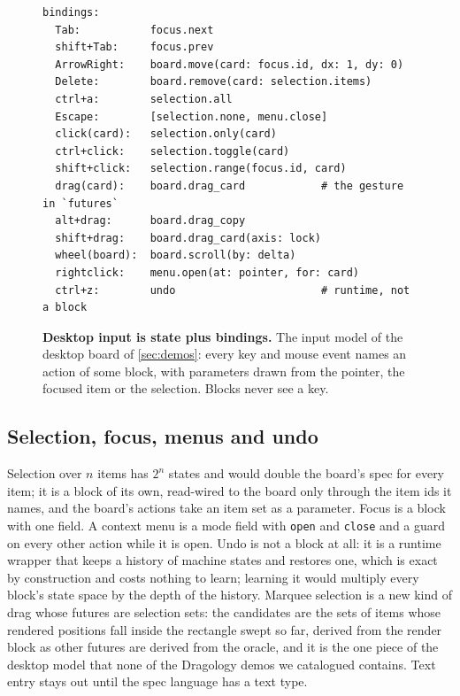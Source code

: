 \begin{figure}[t]
\begin{lstlisting}
bindings:
  Tab:           focus.next
  shift+Tab:     focus.prev
  ArrowRight:    board.move(card: focus.id, dx: 1, dy: 0)
  Delete:        board.remove(card: selection.items)
  ctrl+a:        selection.all
  Escape:        [selection.none, menu.close]
  click(card):   selection.only(card)
  ctrl+click:    selection.toggle(card)
  shift+click:   selection.range(focus.id, card)
  drag(card):    board.drag_card            # the gesture in `futures`
  alt+drag:      board.drag_copy
  shift+drag:    board.drag_card(axis: lock)
  wheel(board):  board.scroll(by: delta)
  rightclick:    menu.open(at: pointer, for: card)
  ctrl+z:        undo                       # runtime, not a block
\end{lstlisting}
\caption{\textbf{Desktop input is state plus bindings.} The input model of the desktop board of
\cref{sec:demos}: every key and mouse event names an action of some block, with parameters drawn from the
pointer, the focused item or the selection. Blocks never see a key.}
\label{fig:bindings}
\end{figure}

\subsection{Selection, focus, menus and undo}
\label{sec:selection}

Selection over $n$ items has $2^n$ states and would double the board's spec for every item; it is a block of its
own, read-wired to the board only through the item ids it names, and the board's actions take an item set as a
parameter. Focus is a block with one field. A context menu is a mode field with \texttt{open} and
\texttt{close} and a guard on every other action while it is open. Undo is not a block at all: it is a runtime
wrapper that keeps a history of machine states and restores one, which is exact by construction and costs
nothing to learn; learning it would multiply every block's state space by the depth of the history. Marquee
selection is a new kind of drag whose futures are selection sets: the candidates are the sets of items whose
rendered positions fall inside the rectangle swept so far, derived from the render block as other futures are
derived from the oracle, and it is the one piece of the desktop model that none of the Dragology demos we
catalogued contains. Text
entry stays out until the spec language has a text type.

